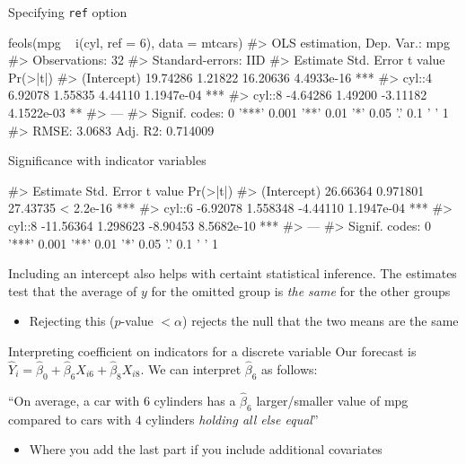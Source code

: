 \documentclass[aspectratio=169,t,11pt,table]{beamer}
\begin{document}
\begin{frame}[fragile]{Specifying \texttt{ref} option}
  \vspace*{-1.25\bigskipamount}
  \begin{codeblock}
feols(mpg ~ i(cyl, ref = 6), data = mtcars)
#> OLS estimation, Dep. Var.: mpg
#> Observations: 32
#> Standard-errors: IID 
#>             Estimate Std. Error  t value   Pr(>|t|)    
#> (Intercept) 19.74286    1.21822 16.20636 4.4933e-16 ***
#> cyl::4       6.92078    1.55835  4.44110 1.1947e-04 ***
#> cyl::8      -4.64286    1.49200 -3.11182 4.1522e-03 ** 
#> ---
#> Signif. codes:  0 '***' 0.001 '**' 0.01 '*' 0.05 '.' 0.1 ' ' 1
#> RMSE: 3.0683   Adj. R2: 0.714009
  \end{codeblock}
\end{frame}

\begin{frame}[fragile]{Significance with indicator variables}
  \vspace*{-1.25\bigskipamount}
  \begin{codeblock}
#>              Estimate Std. Error  t value   Pr(>|t|)    
#> (Intercept)  26.66364   0.971801 27.43735  < 2.2e-16 ***
#> cyl::6       -6.92078   1.558348 -4.44110 1.1947e-04 ***
#> cyl::8      -11.56364   1.298623 -8.90453 8.5682e-10 ***
#> ---
#> Signif. codes:  0 '***' 0.001 '**' 0.01 '*' 0.05 '.' 0.1 ' ' 1
  \end{codeblock}
  
  \bigskip
  Including an intercept also helps with certaint statistical inference.
  The estimates test that the average of $y$ for the omitted group is \emph{the same} for the other groups
  \begin{itemize}
    \item Rejecting this ($p$-value $< \alpha$) rejects the null that the two means are the same
  \end{itemize}
\end{frame}

\begin{frame}{Interpreting coefficient on indicators for a discrete variable}
  Our forecast is $\hat{Y}_i = \hat{\beta}_0 + \hat{\beta}_6 X_{i6} + \hat{\beta}_8 X_{i8}$. We can interpret $\hat{\beta}_6$ as follows:

  \begin{tcolorbox}[boxrule = 0pt, frame hidden, sharp corners, enhanced, borderline west = {2pt}{0pt}{zinc600}, interior hidden]
    ``On average, a car with $6$ cylinders has a $\hat{\beta}_6$ larger/smaller value of mpg compared to cars with $4$ cylinders \emph{\color{blue} holding all else equal}''
  \end{tcolorbox}

  \begin{itemize}
    \item Where you add the last part if you include additional covariates
  \end{itemize}
\end{frame}
\end{document}
